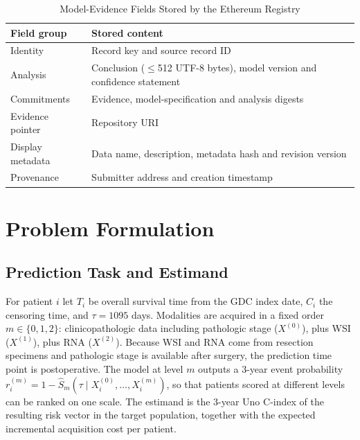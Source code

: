 \documentclass[journal,twoside]{IEEEtran}
\begin{document}
\begin{table}[t]
\centering
\caption{Model-Evidence Fields Stored by the Ethereum Registry}
\label{tab:iface}
\setlength{\tabcolsep}{3pt}
\begin{tabular}{@{}>{\raggedright}p{1.9cm}>{\raggedright\arraybackslash}p{6.15cm}@{}}
\toprule
Field group & Stored content \\
\midrule
Identity & Record key and source record ID \\
Analysis & Conclusion ($\le$512 UTF-8 bytes), model version and confidence statement \\
Commitments & Evidence, model-specification and analysis digests \\
Evidence pointer & Repository URI \\
Display metadata & Data name, description, metadata hash and revision version \\
Provenance & Submitter address and creation timestamp \\
\bottomrule
\end{tabular}
\end{table}

\section{Problem Formulation}
\label{sec:problem}
\subsection{Prediction Task and Estimand}
For patient $i$ let $T_i$ be overall survival time from the GDC index date, $C_i$ the censoring time, and $\tau = 1095$ days. Modalities are acquired in a fixed order $m \in \{0,1,2\}$: clinicopathologic data including pathologic stage ($X^{(0)}$), plus WSI ($X^{(1)}$), plus RNA ($X^{(2)}$). Because WSI and RNA come from resection specimens and pathologic stage is available after surgery, the prediction time point is postoperative. The model at level $m$ outputs a 3-year event probability $r^{(m)}_i = 1 - \hat S_m(\tau \mid X^{(0)}_i,\dots,X^{(m)}_i)$, so that patients scored at different levels can be ranked on one scale. The estimand is the 3-year Uno C-index of the resulting risk vector in the target population, together with the expected incremental acquisition cost per patient.
\end{document}
